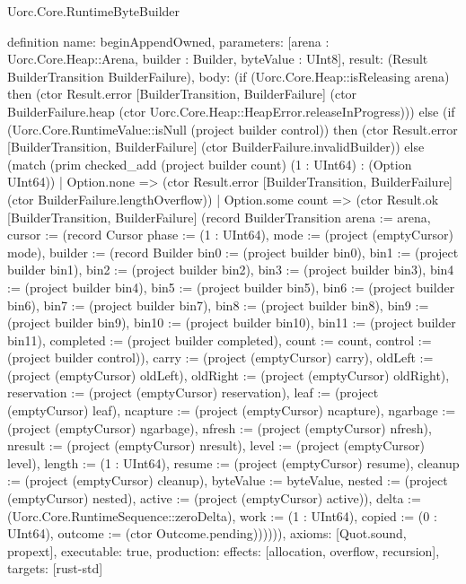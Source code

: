 \begin{lexlean}{Uorc.Core.RuntimeByteBuilder}
\begin{semanticmodule}
definition{
  name: beginAppendOwned,
  parameters: [arena : Uorc.Core.Heap::Arena, builder : Builder, byteValue : UInt8],
  result: (Result BuilderTransition BuilderFailure),
  body: (if (Uorc.Core.Heap::isReleasing arena) then (ctor Result.error [BuilderTransition, BuilderFailure] (ctor BuilderFailure.heap (ctor Uorc.Core.Heap::HeapError.releaseInProgress))) else (if (Uorc.Core.RuntimeValue::isNull (project builder control)) then (ctor Result.error [BuilderTransition, BuilderFailure] (ctor BuilderFailure.invalidBuilder)) else (match (prim checked_add (project builder count) (1 : UInt64) : (Option UInt64))
    | Option.none => (ctor Result.error [BuilderTransition, BuilderFailure] (ctor BuilderFailure.lengthOverflow))
    | Option.some count => (ctor Result.ok [BuilderTransition, BuilderFailure] (record BuilderTransition {arena := arena, cursor := (record Cursor {phase := (1 : UInt64), mode := (project (emptyCursor) mode), builder := (record Builder {bin0 := (project builder bin0), bin1 := (project builder bin1), bin2 := (project builder bin2), bin3 := (project builder bin3), bin4 := (project builder bin4), bin5 := (project builder bin5), bin6 := (project builder bin6), bin7 := (project builder bin7), bin8 := (project builder bin8), bin9 := (project builder bin9), bin10 := (project builder bin10), bin11 := (project builder bin11), completed := (project builder completed), count := count, control := (project builder control)}), carry := (project (emptyCursor) carry), oldLeft := (project (emptyCursor) oldLeft), oldRight := (project (emptyCursor) oldRight), reservation := (project (emptyCursor) reservation), leaf := (project (emptyCursor) leaf), ncapture := (project (emptyCursor) ncapture), ngarbage := (project (emptyCursor) ngarbage), nfresh := (project (emptyCursor) nfresh), nresult := (project (emptyCursor) nresult), level := (project (emptyCursor) level), length := (1 : UInt64), resume := (project (emptyCursor) resume), cleanup := (project (emptyCursor) cleanup), byteValue := byteValue, nested := (project (emptyCursor) nested), active := (project (emptyCursor) active)}), delta := (Uorc.Core.RuntimeSequence::zeroDelta), work := (1 : UInt64), copied := (0 : UInt64), outcome := (ctor Outcome.pending)}))))),
  axioms: [Quot.sound, propext],
  executable: true,
  production: {effects: [allocation, overflow, recursion], targets: [rust-std]}
}


\end{semanticmodule}
\end{lexlean}

